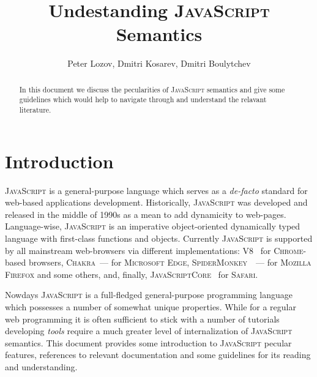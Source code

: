 \documentclass{article}
\date{}
\newcommand{\js}{\textsc{JavaScript}\xspace}
\begin{document}
\title{Undestanding \js Semantics}

\author{Peter Lozov, Dmitri Kosarev, Dmitri Boulytchev}

\maketitle

\begin{abstract}
  In this document we discuss the pecularities of \js semantics and give some
  guidelines which would help to navigate through and understand the relavant
  literature.
\end{abstract}

\section{Introduction}

\js is a general-purpose language which serves as a \emph{de-facto} standard for web-based
applications development. Historically, \js was developed and released in the middle of 1990s
as a mean to add dynamicity to web-pages. Language-wise, \js is an imperative object-oriented
dynamically typed language with first-class functions and objects. Currently \js is
supported by all mainstream web-browsers via different implementations: \textsc{V8}~\cite{V8}
for \textsc{Chrome}-based browsers, \textsc{Chakra}~--- for \textsc{Microsoft Edge},
\textsc{SpiderMonkey}~\cite{SpiderMonkey}~--- for \textsc{Mozilla Firefox} and some others, and,
finally, \textsc{JavaScriptCore}~\cite{JavaScriptCore} for \textsc{Safari}.

Nowdays \js is a full-fledged general-purpose programming language which possesses a number of
somewhat unique properties. While for a regular web programming it is often sufficient to
stick with a number of tutorials~\cite{Tutorial} developing \emph{tools} require a
much greater level of internalization of \js semantics. This document provides some
introduction to \js pecular features, references to relevant documentation and
some guidelines for its reading and understanding. 
\end{document}
